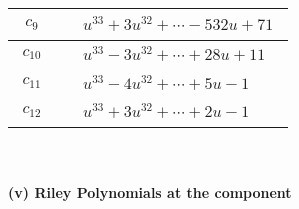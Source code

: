 \documentclass[1p]{elsarticle_modified}
\theoremstyle{definition}
\begin{document}
\begin{tabular}{m{50pt}|m{274pt}}
\hline $$\begin{aligned}c_{9}\end{aligned}$$&$\begin{aligned}
&u^{33}+3 u^{32}+\cdots-532 u+71
\end{aligned}$\\
\hline $$\begin{aligned}c_{10}\end{aligned}$$&$\begin{aligned}
&u^{33}-3 u^{32}+\cdots+28 u+11
\end{aligned}$\\
\hline $$\begin{aligned}c_{11}\end{aligned}$$&$\begin{aligned}
&u^{33}-4 u^{32}+\cdots+5 u-1
\end{aligned}$\\
\hline $$\begin{aligned}c_{12}\end{aligned}$$&$\begin{aligned}
&u^{33}+3 u^{32}+\cdots+2 u-1
\end{aligned}$\\
\hline
\end{tabular}\\~\\
\newpage\renewcommand{\arraystretch}{1}
\flushleft \textbf{(v) Riley Polynomials at the component}\newline \\
\end{document}
